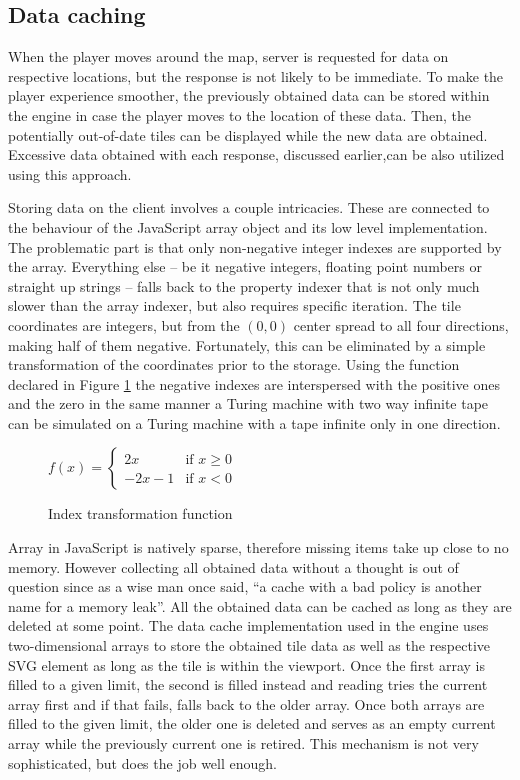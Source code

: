 \documentclass[11pt,oneside, final]{fithesis2}
\begin{document}
\subsection{Data caching}
When the player moves around the map, server is requested for data on respective locations, but the response is not likely to be immediate. To make the player experience smoother, the previously obtained data can be stored within the engine in case the player moves to the location of these data. Then, the potentially out-of-date tiles can be displayed while the new data are obtained. Excessive data obtained with each response, discussed earlier,can be also utilized using this approach.

Storing data on the client involves a couple intricacies. These are connected to the behaviour of the JavaScript array object and its low level implementation. The problematic part is that only non-negative integer indexes are supported by the array\cite{ecma}. Everything else -- be it negative integers, floating point numbers or straight up strings -- falls back to the property indexer that is not only much slower than the array indexer, but also requires specific iteration. The tile coordinates are integers, but from the $(0,0)$ center spread to all four directions, making half of them negative. Fortunately, this can be eliminated by a simple transformation of the coordinates prior to the storage. Using the function declared in Figure \ref{indextransformation} the negative indexes are interspersed with the positive ones and the zero in the same manner a Turing machine with two way infinite tape can be simulated on a Turing machine with a tape infinite only in one direction.

\begin{figure}[h]
\centering
\begin{math}
f(x) = 
\left\{
	\begin{array}{ll}
		2x  & \mbox{if } x \geq 0\\
		-2x - 1 & \mbox{if } x < 0
	\end{array}
\right.
\end{math}
\caption{Index transformation function}
\label{indextransformation}
\end{figure}

Array in JavaScript is natively sparse, therefore missing items take up close to no memory\cite{javascriptarray}. However collecting all obtained data without a thought is out of question since as a wise man once said, ``a cache with a bad policy is another name for a memory leak''\cite{chen}. All the obtained data can be cached as long as they are deleted at some point. The data cache implementation used in the engine uses two-dimensional arrays to store the obtained tile data as well as the respective SVG element as long as the tile is within the viewport. Once the first array is filled to a given limit, the second is filled instead and reading tries the current array first and if that fails, falls back to the older array. Once both arrays are filled to the given limit, the older one is deleted and serves as an empty current array while the previously current one is retired. This mechanism is not very sophisticated, but does the job well enough.
\end{document}

